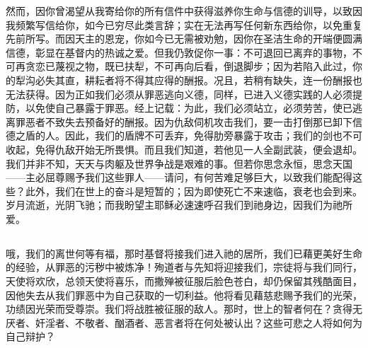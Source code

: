然而，因你曾渴望从我寄给你的所有信件中获得滋养你生命与信德的训导，以致因我频繁写信给你，如今已穷尽此类言辞；实在无法再写任何新东西给你，以免重复先前所写。而因天主的恩宠，你如今已无需被劝勉，因你在圣洁生命的开端便圆满信德，彰显在基督内的热诚之爱。但我仍敦促你一事：不可退回已离弃的事物，不可再贪恋已蔑视之物，既已扶犁，不可再向后看，倒退脚步；因为若陷入此过，你的犁沟必失其直，耕耘者将不得其应得的酬报。况且，若稍有缺失，连一份酬报也无法获得。因为正如我们必须从罪恶逃向义德，同样，已进入义德实践的人必须提防，以免使自己暴露于罪恶。经上记载：为此，我们必须站立，必须劳苦，使已逃离罪恶者不致失去预备好的酬报。因为仇敌伺机攻击我们，要一击打倒那已卸下信德之盾的人。因此，我们的盾牌不可丢弃，免得肋旁暴露于攻击；我们的剑也不可收起，免得仇敌开始无所畏惧。而且我们知道，若他见一人全副武装，便会退却。我们并非不知，天天与肉躯及世界争战是艰难的事。但若你思念永恒，思念天国——主必屈尊赐予我们这些罪人——请问，有何苦难足够巨大，以致我们能配得这些？此外，我们在世上的奋斗是短暂的；因为即使死亡不来速临，衰老也会到来。岁月流逝，光阴飞驰；而我盼望主耶稣必速速呼召我们到祂身边，因我们为祂所爱。\par


\subsection{}

哦，我们的离世何等有福，那时基督将接我们进入祂的居所，我们已藉更美好生命的经验，从罪恶的污秽中被炼净！殉道者与先知将迎接我们，宗徒将与我们同行，天使将欢欣，总领天使将喜乐，而撒殚被征服后脸色苍白，却仍保留其残酷面目，因他失去从我们罪恶中为自己获取的一切利益。他将看见藉慈悲赐予我们的光荣，功绩因光荣而受尊崇。我们将战胜被征服的敌人。那时，世上的智者何在？贪得无厌者、奸淫者、不敬者、酗酒者、恶言者将在何处被认出？这些可悲之人将如何为自己辩护？\par


\subsection{}

